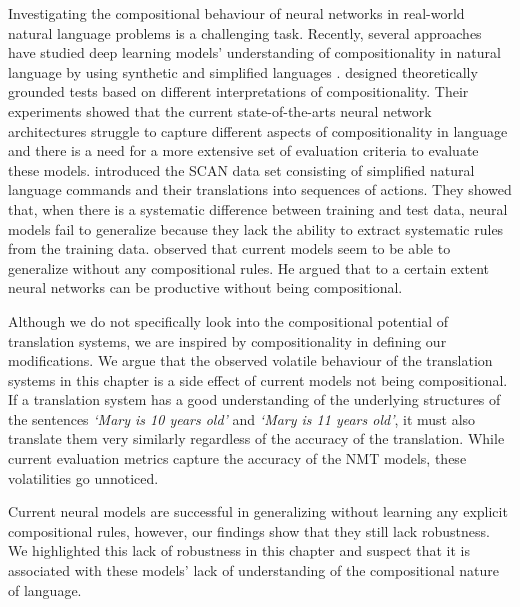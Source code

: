 Investigating the compositional behaviour of neural networks in real-world natural language problems is a challenging task. 
Recently, several approaches have studied deep learning models' understanding of compositionality in natural language by using synthetic and simplified languages \citep{DBLP:journals/corr/abs-1902-07181,babyai_iclr19}.
\citet{ijcai2020-708} designed theoretically grounded tests based on different interpretations of compositionality. 
Their experiments showed that the current state-of-the-arts neural network architectures struggle to capture different aspects of compositionality in language and there is a need for a more extensive set of evaluation criteria to evaluate these models.
\citet{886a37b5fc2f43449e4bca3b5557e3ae} introduced the SCAN data set consisting of simplified natural language commands and their translations into sequences of actions.
They showed that, when there is a systematic difference between training and test data, neural models fail to generalize because they lack the ability to extract systematic rules from the training data. 
\citet{DBLP:journals/corr/abs-1904-00157} observed that current models seem to be able to generalize without any compositional rules.
He argued that to a certain extent neural networks can be productive without being compositional.

Although we do not specifically look into the compositional potential of translation systems, we are inspired by compositionality in defining our modifications.
We argue that the observed volatile behaviour of the translation systems in this chapter is a side effect of current models not being compositional.  
If a translation system has a good understanding of the underlying structures of the sentences \textit{`Mary is 10 years old'} and \textit{`Mary is 11 years old'}, it must also translate them very similarly regardless of the accuracy of the translation. 
While current evaluation metrics capture the accuracy of the NMT models, these volatilities go unnoticed.  

Current neural models are successful in generalizing without learning any explicit compositional rules, however, our findings show that they still lack robustness.
We highlighted this lack of robustness in this chapter and suspect that it is associated with these models' lack of understanding of the compositional nature of language.


